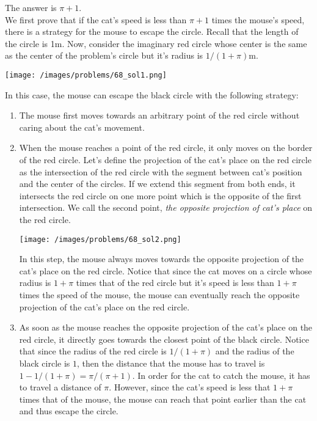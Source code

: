 \begin{solution}
The answer is $\pi + 1$.\\[0.2cm]

We first prove that if the cat's speed is less than $\pi + 1$ times the mouse's speed, there is a strategy for the mouse to escape the circle. Recall that the length of the circle is 1m. Now, consider the imaginary red circle whose center is the same as the center of the problem's circle but it's radius is $1/(1+\pi)$m.
\begin{center}
	\texttt{[image: /images/problems/68\_sol1.png]}
\end{center}
In this case, the mouse can escape the black circle with the following strategy:
\begin{enumerate}
	\item The mouse first moves towards an arbitrary point of the red circle without caring about the cat's movement.
	\item When the mouse reaches a point of the red circle, it only moves on the border of the red circle. Let's define the projection of the cat's place on the red circle as the intersection of the red circle with the segment between cat's position and the center of the circles. If we extend this segment from both ends, it intersects the red circle on one more point which is the opposite of the first intersection. We call the second point, \textit{the opposite projection of cat's place} on the red circle.\\
	\begin{center}
		\texttt{[image: /images/problems/68\_sol2.png]}
	\end{center}
	In this step, the mouse always moves towards the opposite projection of the cat's place on the red circle. Notice that since the cat moves on a circle whose radius is $1+\pi$ times that of the red circle but it's speed is less than $1+\pi$ times the speed of the mouse, the mouse can eventually reach the opposite projection of the cat's place on the red circle.
	\item As soon as the mouse reaches the opposite projection of the cat's place on the red circle, it directly goes towards the closest point of the black circle. Notice that since the radius of the red circle is $1/(1+\pi)$ and the radius of the black circle is $1$, then the distance that the mouse has to travel is $1-1/(1+\pi) = \pi / (\pi+1)$. In order for the cat to catch the mouse, it has to travel a distance of $\pi$. However, since the cat's speed is less that $1+\pi$ times that of the mouse, the mouse can reach that point earlier than the cat and thus escape the circle.
\end{enumerate}



\end{solution}
